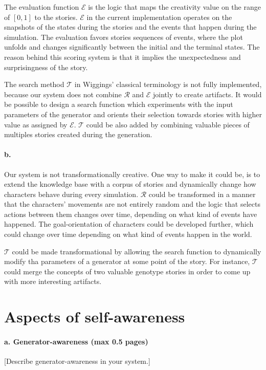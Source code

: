 \documentclass[english]{tktltiki}
\begin{document}
    The evaluation function $\mathcal{E}$ is the logic that maps the creativity value on the range of $[0, 1]$ to the stories. $\mathcal{E}$ in the current implementation operates on the snapshots of the states during the stories and the events that happen during the simulation. The evaluation favors stories sequences of events, where the plot unfolds and changes significantly between the initial and the terminal states. The reason behind this scoring system is that it implies the unexpectedness and surprisingness of the story.

    The search method $\mathcal{T}$ in Wiggings' classical terminology is not fully implemented, because our system does not combine $\mathcal{R}$ and $\mathcal{E}$ jointly to create artifacts. It would be possible to design a search function which experiments with the input parameters of the generator and orients their selection towards stories with higher value as assigned by $\mathcal{E}$. $\mathcal{T}$ could be also added by combining valuable pieces of multiples stories created during the generation. 
    
    \paragraph{b.} Our system is not transformationally creative. One way to make it could be, is to extend the knowledge base with a corpus of stories and dynamically change how characters behave during every simulation. $\mathcal{R}$ could be transformed in a manner that the characters' movements are not entirely random and the logic that selects actions between them changes over time, depending on what kind of events have happened. The goal-orientation of characters could be developed further, which could change over time depending on what kind of events happen in the world. 
    
    $\mathcal{T}$ could be made transformational by allowing the search function to dynamically modify tha parameters of a generator at some point of the story. For instance, $\mathcal{T}$ could merge the concepts of two valuable genotype stories in order to come up with more interesting artifacts.
    
    \pagebreak
    
    \section{Aspects of self-awareness}
    
    \paragraph{a. Generator-awareness (max 0.5 pages)}
    [Describe generator-awareness in your system.]
    
\end{document}
